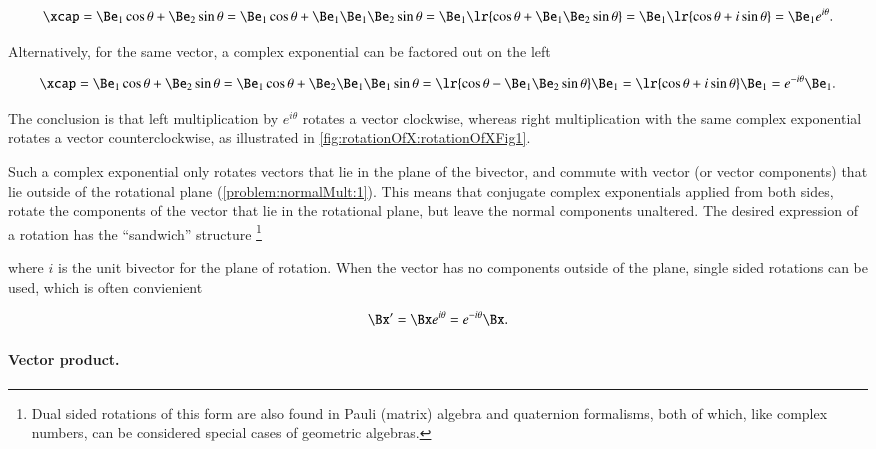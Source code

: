 \begin{dmath}\label{eqn:SimpleProducts2:940}
\xcap
=
\Be_1 \cos\theta + \Be_2 \sin\theta
=
\Be_1 \cos\theta + \Be_1 \Be_1 \Be_2 \sin\theta
=
\Be_1 \lr{ \cos\theta + \Be_1 \Be_2 \sin\theta }
=
\Be_1 \lr{ \cos\theta + i \sin\theta }
=
\Be_1 e^{i\theta}.
\end{dmath}

Alternatively, for the same vector, a complex exponential can be factored out on the left

\begin{dmath}\label{eqn:SimpleProducts2:960}
\xcap
=
\Be_1 \cos\theta + \Be_2 \sin\theta
=
\Be_1 \cos\theta + \Be_2 \Be_1 \Be_1 \sin\theta
=
\lr{ \cos\theta - \Be_1 \Be_2 \sin\theta } \Be_1
=
\lr{ \cos\theta + i \sin\theta } \Be_1
=
e^{-i\theta} \Be_1.
\end{dmath}

The conclusion is that left multiplication by \( e^{i\theta} \) rotates a vector clockwise, whereas right multiplication with the same complex exponential rotates a vector counterclockwise, as
illustrated in \cref{fig:rotationOfX:rotationOfXFig1}.

Such a complex exponential only rotates vectors that lie in the plane of the bivector, and commute with vector (or vector components) that lie outside of the rotational plane (\cref{problem:normalMult:1}).
This means that conjugate complex exponentials applied from both sides,
rotate the components of the vector that lie in the rotational plane, but leave the normal components unaltered.
The desired expression of a  rotation
has the ``sandwich'' structure
\footnote{Dual sided rotations of this form are also found in Pauli (matrix) algebra and quaternion formalisms, both of which, like complex numbers, can be considered special cases of geometric algebras.}


where \( i \) is the unit bivector for the plane of rotation.
When the vector has no components outside of the plane, single sided rotations can be used, which is often convienient

\begin{equation}\label{eqn:SimpleProducts2:980}
\Bx' = \Bx e^{i \theta} = e^{-i\theta} \Bx.
\end{equation}

\paragraph{Vector product.}


